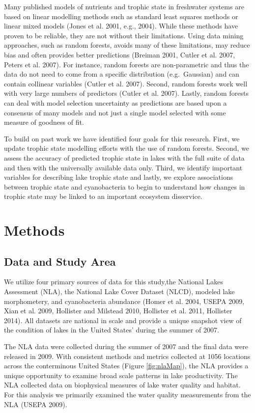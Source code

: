 \documentclass[11pt,]{article}
\begin{document}
Many published models of nutrients and trophic state in freshwater
systems are based on linear modelling methods such as standard least
squares methods or linear mixed models (Jones et al. 2001, e.g., 2004).
While these methods have proven to be reliable, they are not without
their limitations. Using data mining approaches, such as random forests,
avoids many of these limitations, may reduce bias and often provides
better predictions (Breiman 2001, Cutler et al. 2007, Peters et al.
2007). For instance, random forests are non-parametric and thus the data
do not need to come from a specific distribution (e.g.~Gaussian) and can
contain collinear variables (Cutler et al. 2007). Second, random forests
work well with very large numbers of predictors (Cutler et al. 2007).
Lastly, random forests can deal with model selection uncertainty as
predictions are based upon a consensus of many models and not just a
single model selected with some measure of goodness of fit.

To build on past work we have identified four goals for this research.
First, we update trophic state modelling efforts with the use of random
forests. Second, we assess the accuracy of predicted trophic state in
lakes with the full suite of data and then with the universally
available data only. Third, we identify important variables for
describing lake trophic state and lastly, we explore associations
between trophic state and cyanobacteria to begin to understand how
changes in trophic state may be linked to an important ecosystem
disservice.

\section{Methods}\label{methods}

\subsection{Data and Study Area}\label{data-and-study-area}

We utilize four primary sources of data for this study,the National
Lakes Assessment (NLA), the National Lake Cover Dataset (NLCD), modeled
lake morphometery, and cyanobacteria abundance (Homer et al. 2004, USEPA
2009, Xian et al. 2009, Hollister and Milstead 2010, Hollister et al.
2011, Hollister 2014). All datasets are national in scale and provide a
unique snapshot view of the condition of lakes in the United States'
during the summer of 2007.

The NLA data were collected during the summer of 2007 and the final data
were released in 2009. With consistent methods and metrics collected at
1056 locations across the conterminous United States (Figure
\ref{fig:nlaMap}), the NLA provides a unique opportunity to examine
broad scale patterns in lake productivity. The NLA collected data on
biophysical measures of lake water quality and habitat. For this
analysis we primarily examined the water quality measurements from the
NLA (USEPA 2009).
\end{document}
